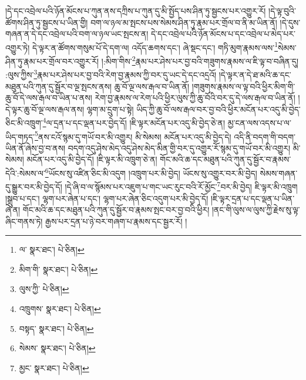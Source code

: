 །དེ་དང་འབྲེལ་པའི་ཉོན་མོངས་པ་ཀུན་ནས་དཀྲིས་པ་ཀུན་དུ་མི་སྤྱོད་པས་ཤིན་ཏུ་སྦྱངས་པར་འགྱུར་རོ། །དེ་ལྟ་བུའི་ཚོགས་ཤིན་ཏུ་སྦྱངས་པ་ཡིན་གྱི། བག་ལ་ཉལ་མ་སྤངས་པས་སེམས་ཤིན་ཏུ་རྣམ་པར་གྲོལ་བ་ནི་མ་ཡིན་ནོ། །དེ་དུས་གཞན་ན་དེ་དང་འབྲེལ་པའི་བག་ལ་ཉལ་ཡང་སྤངས་ན། དེ་དང་འབྲེལ་པའི་ཉོན་མོངས་པ་དང་འབྲེལ་པ་མེད་པར་འགྱུར་ཏེ། དེ་ལྟར་ན་ཚོགས་གསུམ་པོ་དེ་དག་ལ། འདོད་ཆགས་དང་། ཞེ་སྡང་དང་། གཏི་མུག་རྣམས་ལས་\footnote{ལ་  སྣར་ཐང་།  པེ་ཅིན། }སེམས་ཤིན་ཏུ་རྣམ་པར་གྲོལ་བར་འགྱུར་རོ། །:མིག་གིས་\footnote{མིག་གི་  སྣར་ཐང་།  པེ་ཅིན། }རྣམ་པར་ཤེས་པར་བྱ་བའི་གཟུགས་རྣམས་ལ་ཇི་ལྟ་བ་བཞིན་དུ། :ལུས་ཀྱིས་\footnote{ལུས་ཀྱི་  པེ་ཅིན། }རྣམ་པར་ཤེས་པར་བྱ་བའི་རེག་བྱ་རྣམས་ཀྱི་བར་དུ་ཡང་དེ་དང་འདྲའོ། །དེ་ལྟར་ན་དེ་ཐ་མའི་ཆ་དང་མཐུན་པའི་ཀུན་དུ་སྦྱོར་བ་ལྔ་སྤངས་ནས། ཆུ་བོ་ལྔ་ལས་རྒལ་བ་ཡིན་ནོ། །གཟུགས་རྣམས་ལ་ལྟ་བའི་ཕྱིར་མིག་གི་ཆུ་བོ་དེ་ལས་རྒལ་བ་ཡིན་པ་ནས། རེག་བྱ་རྣམས་ལ་རེག་པའི་ཕྱིར་ལུས་ཀྱི་ཆུ་བོའི་བར་དུ་དེ་ལས་རྒལ་བ་ཡིན་ནོ། །དེ་ལྟར་ཆུ་བོ་ལྔ་ལས་རྒལ་ནས། ལྷག་མ་དྲུག་པ་སྟེ། ཡིད་ཀྱི་ཆུ་བོ་ལས་རྒལ་བར་བྱ་བའི་ཕྱིར་མངོན་པར་འདུ་མི་བྱེད་ཅིང་མི་འཁྲུག་\footnote{འཁྲུགས་  སྣར་ཐང་།  པེ་ཅིན། }ལ་དྲན་པ་དང་ལྡན་པར་བྱེད་དོ། །ཇི་ལྟར་མངོན་པར་འདུ་མི་བྱེད་ཅེ་ན། མྱ་ངན་ལས་འདས་པ་ལ་ཡིད་གཏད་\footnote{བསྟད་  སྣར་ཐང་།  པེ་ཅིན། }ནས་ངའོ་སྙམ་དུ་གཡོ་བར་མི་འགྱུར། མི་སེམས། མངོན་པར་འདུ་མི་བྱེད་དེ། འདི་ནི་བདག་གི་བདག་ཡིན་ནོ་ཞེས་བྱ་བ་ནས། བདག་འདུ་ཤེས་མེད་འདུ་ཤེས་མེད་མིན་གྱི་བར་དུ་འགྱུར་རོ་སྙམ་དུ་གཡོ་བར་མི་འགྱུར། མི་སེམས། མངོན་པར་འདུ་མི་བྱེད་དོ། །ཇི་ལྟར་མི་འཁྲུག་ཅེ་ན། གོང་མའི་ཆ་དང་མཐུན་པའི་ཀུན་དུ་སྦྱོར་བ་རྣམས་དེའི་:སེམས་ལ་\footnote{སེམས་  སྣར་ཐང་།  པེ་ཅིན། }ཡོངས་སུ་འཛིན་ཅིང་མི་འདུག །འཁྲུག་པར་མི་བྱེད། ཡོངས་སུ་འགྱུར་བར་མི་བྱེད། སེམས་གཞན་དུ་སྒྱུར་བར་མི་བྱེད་དོ། །དེ་ཞི་བ་ལ་སྙོམས་པར་འཇུག་པ་གང་ཡང་རུང་བའི་རོ་མྱོང་\footnote{མྱང་  སྣར་ཐང་།  པེ་ཅིན། }བར་མི་བྱེད། ཇི་ལྟར་མི་འཁྲུག །སྒྲུབ་པ་དང་། ལྷག་པར་ཞེན་པ་དང་། ལྷག་པར་ཞེན་ཅིང་འདུག་པར་མི་བྱེད་དོ། །ཇི་ལྟར་དྲན་པ་དང་ལྡན་པ་ཡིན་ཞེ་ན། གོང་མའི་ཆ་དང་མཐུན་པའི་ཀུན་དུ་སྦྱོར་བ་རྣམས་སྤང་བར་བྱ་བའི་ཕྱིར། །ནང་གི་ལུས་ལ་ལུས་ཀྱི་རྗེས་སུ་ལྟ་ཞིང་གནས་ཏེ། རྒྱས་པར་དྲན་པ་ཉེ་བར་གཞག་པ་རྣམས་དང་སྦྱར་རོ། །
